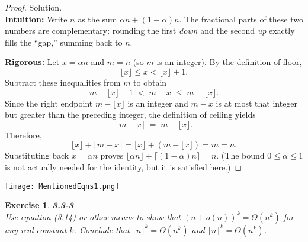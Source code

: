 \documentclass[12pt]{article}
\newtheorem{exercise}[theorem]{Exercise}
\theoremstyle{definition}
\begin{document}
\begin{proof}
Solution. \\

\noindent
\textbf{Intuition:}
Write $n$ as the sum $\alpha n + (1-\alpha)n$. The fractional parts of these two numbers are complementary:
rounding the first \emph{down} and the second \emph{up} exactly fills the “gap,” summing back to $n$.

\noindent
\textbf{Rigorous:}
Let $x=\alpha n$ and $m=n$ (so $m$ is an integer). By the definition of floor,
\[
\lfloor x \rfloor \le x < \lfloor x \rfloor + 1.
\]
Subtract these inequalities from $m$ to obtain
\[
m-\lfloor x \rfloor - 1 \;<\; m-x \;\le\; m-\lfloor x \rfloor .
\]
Since the right endpoint $m-\lfloor x \rfloor$ is an integer and $m-x$ is at most that integer but greater than the
preceding integer, the definition of ceiling yields
\[
\lceil m-x \rceil \;=\; m-\lfloor x \rfloor .
\]
Therefore,
\[
\lfloor x \rfloor + \lceil m-x \rceil
= \lfloor x \rfloor + (m-\lfloor x \rfloor)
= m
= n.
\]
Substituting back $x=\alpha n$ proves $\lfloor \alpha n \rfloor + \lceil (1-\alpha)n \rceil = n$.
(The bound $0\le \alpha \le 1$ is not actually needed for the identity, but it is satisfied here.)
\end{proof}

\newpage

\begin{center}
    \texttt{[image: MentionedEqns1.png]}
\end{center}

\newpage

\begin{exercise}
\noindent
\textbf{3.3-3} \\
Use equation (3.14) or other means to show that $(n+o(n))^k = \Theta(n^k)$ for any real constant $k$. 
Conclude that $\lfloor n \rfloor^k = \Theta(n^k)$ and $\lceil n \rceil^k = \Theta(n^k)$.
\end{exercise}
\end{document}

